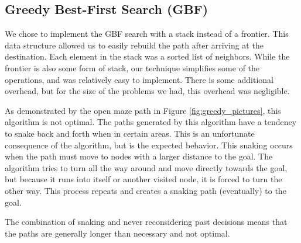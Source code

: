 \documentclass{article}
\begin{document}

\subsection{Greedy Best-First Search (GBF)}

We chose to implement the GBF search with a stack instead of a frontier. This data structure allowed us to easily rebuild the path after arriving at the destination. Each element in the stack was a sorted list of neighbors. While the frontier is also some form of stack, our technique simplifies some of the operations, and was relatively easy to implement. There is some additional overhead, but for the size of the problems we had, this overhead was negligible.

As demonstrated by the open maze path in Figure \ref{fig:greedy_pictures}, this algorithm is not optimal. The paths generated by this algorithm have a tendency to snake back and forth when in certain areas. This is an unfortunate consequence of the algorithm, but is the expected behavior. This snaking occurs when the path must move to nodes with a larger distance to the goal. The algorithm tries to turn all the way around and move directly towards the goal, but because it runs into itself or another visited node, it is forced to turn the other way. This process repeats and creates a snaking path (eventually) to the goal.

The combination of snaking and never reconsidering past decisions means that the paths are generally longer than necessary and not optimal.
\end{document}

